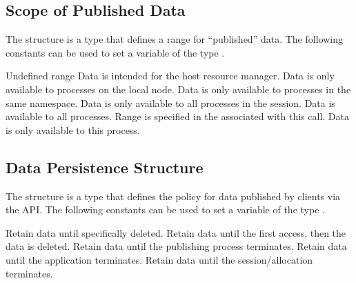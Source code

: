 \subsection{Scope of Published Data}

The  structure is a  type that defines a range for ``published'' data.
The following constants can be used to set a variable of the type .

\begin{constantdesc}
%
Undefined range
%
Data is intended for the host resource manager.
%
Data is only available to processes on the local node.
%
Data is only available to processes in the same namespace.
%
Data is only available to all processes in the session.
%
Data is available to all processes.
%
Range is specified in the  associated with this call.
%
Data is only available to this process.
%
\end{constantdesc}



\subsection{Data Persistence Structure}

The  structure is a  type that defines the policy for data published by clients via the  \ac{API}.
The following constants can be used to set a variable of the type .

\begin{constantdesc}
%
Retain data until specifically deleted.
%
Retain data until the first access, then the data is deleted.
%
Retain data until the publishing process terminates.
%
Retain data until the application terminates.
%
Retain data until the session/allocation terminates.
%
\end{constantdesc}



